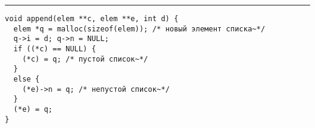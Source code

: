 \documentclass{article}
\begin{document}
\lstset{language = C,
    extendedchars = \true,
    keepspaces = true,
    breaklines=true,
    frame=lines}
\hrule
\begin{lstlisting}[title=\textbf {Алгоритм 1.2} Построение бинарного кода Грея]
void append(elem **c, elem **e, int d) {
  elem *q = malloc(sizeof(elem)); /* новый элемент списка~*/
  q->i = d; q->n = NULL;
  if ((*c) == NULL) {
    (*c) = q; /* пустой список~*/
  }
  else {
    (*e)->n = q; /* непустой список~*/
  }
  (*e) = q;
}
\end{lstlisting}
\end{document}
